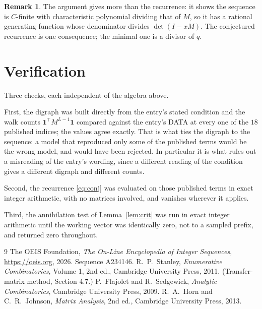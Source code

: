 \documentclass[11pt,a4paper]{article}
\theoremstyle{plain}
\theoremstyle{definition}
\newtheorem{remark}[theorem]{Remark}
\begin{document}
\begin{remark}
The argument gives more than the recurrence: it shows the sequence is $C$-finite with
characteristic polynomial dividing that of $M$, so it has a rational generating function
whose denominator divides $\det(I-xM)$. The conjectured recurrence is one consequence; the
minimal one is a divisor of $q$.
\end{remark}

\section{Verification}

Three checks, each independent of the algebra above.

First, the digraph was built directly from the entry's stated condition and the walk counts
$\mathbf{1}^{\!\top}M^{L-1}\mathbf{1}$ compared against the entry's DATA at
every one of the $18$ published indices; the values agree exactly. That is what ties
the digraph to the sequence: a model that reproduced only some of the published terms would
be the wrong model, and would have been rejected. In particular it is what rules out a
misreading of the entry's wording, since a different reading of the condition gives a
different digraph and different counts.

Second, the recurrence \eqref{eq:conj} was evaluated on those published terms in exact
integer arithmetic, with no matrices involved, and vanishes wherever it applies.

Third, the annihilation test of Lemma~\ref{lem:crit} was run in exact integer arithmetic
until the working vector was identically zero, not to a sampled prefix, and returned zero
throughout.

\begin{thebibliography}{9}
 The OEIS Foundation, \emph{The On-Line Encyclopedia of Integer
Sequences}, \url{https://oeis.org}, 2026. Sequence A234146.
 R.~P.~Stanley, \emph{Enumerative Combinatorics}, Volume 1, 2nd ed.,
Cambridge University Press, 2011. (Transfer-matrix method, Section 4.7.)
 P.~Flajolet and R.~Sedgewick, \emph{Analytic Combinatorics}, Cambridge
University Press, 2009.
 R.~A.~Horn and C.~R.~Johnson, \emph{Matrix Analysis}, 2nd ed., Cambridge
University Press, 2013.
\end{thebibliography}
\end{document}
